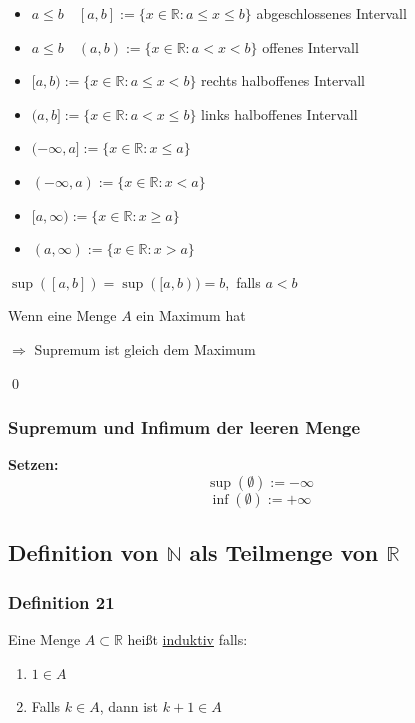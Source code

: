 \documentclass[fleqn]{scrartcl}
\renewenvironment{proof}{{\bfseries Beweis }}{\qed}
\begin{document}
\begin{itemize}
  \item $a \leq b \quad [a,b] := \{x \in \mathbb{R}:a \leq x \leq b\}$ abgeschlossenes Intervall
  \item $a \leq b \quad (a,b) := \{x \in \mathbb{R}:a < x < b\}$ offenes Intervall
  \item $[a,b) := \{x \in \mathbb{R}:a \leq x < b\}$ rechts halboffenes Intervall
  \item $(a,b]:= \{x \in \mathbb{R}:a < x \leq b\}$ links halboffenes Intervall
  \item $(-\infty,a]:= \{x \in \mathbb{R}:x \leq a\}$
  \item $(-\infty,a):= \{x \in \mathbb{R}:x < a\}$
  \item $[a,\infty):= \{x \in \mathbb{R}:x \geq a\}$
  \item $(a,\infty):= \{x \in \mathbb{R}:x > a\}$
\end{itemize}

\begin{proof}
$\sup([a,b])=\sup([a,b)) = b,$ falls $a<b \quad $

Wenn eine Menge $A$ ein Maximum hat 

$\Longrightarrow$ Supremum ist gleich dem Maximum

\end{proof}

\subsubsection{Supremum und Infimum der leeren Menge}
\textbf{Setzen:}
\[\sup(\emptyset):=-\infty\]
\[\inf(\emptyset):=+\infty\]

\subsection{Definition von $\mathbb{N}$ als Teilmenge von $\mathbb{R}$}

\subsubsection{Definition 21}

Eine Menge $A \subset \mathbb{R}$ heißt \underline{induktiv} falls:

\begin{enumerate}
  \item $1 \in A$
  \item Falls $k \in A$, dann ist $k+1 \in A$
\end{enumerate}
\end{document}
